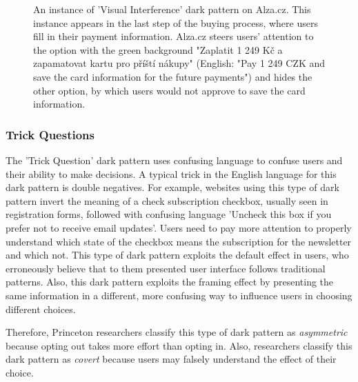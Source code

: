             \begin{figure}[ht]
                \centering
                \caption{An instance of 'Visual Interference' dark pattern on Alza.cz. This instance appears in the last step of the buying process, where users fill in their payment information. Alza.cz steers users' attention to the option with the green background "Zaplatit 1 249 Kč a zapamatovat kartu pro příští nákupy" (English: "Pay 1 249 CZK and save the card information for the future payments") and hides the other option, by which users would not approve to save the card information.}
                \label{fig:visual-interference-alza}
            \end{figure}
    
            \subsubsection{Trick Questions}
            The 'Trick Question' dark pattern uses confusing language to confuse users and their ability to make decisions. A typical trick in the English language for this dark pattern is double negatives. For example, websites using this type of dark pattern invert the meaning of a check subscription checkbox, usually seen in registration forms, followed with confusing language 'Uncheck this box if you prefer not to receive email updates'. Users need to pay more attention to properly understand which state of the checkbox means the subscription for the newsletter and which not. This type of dark pattern exploits the default effect in users, who erroneously believe that to them presented user interface follows traditional patterns. Also, this dark pattern exploits the framing effect by presenting the same information in a different, more confusing way to influence users in choosing different choices.
            
            Therefore, Princeton researchers classify this type of dark pattern as \emph{asymmetric} because opting out takes more effort than opting in. Also, researchers classify this dark pattern as \emph{covert} because users may falsely understand the effect of their choice.
    

